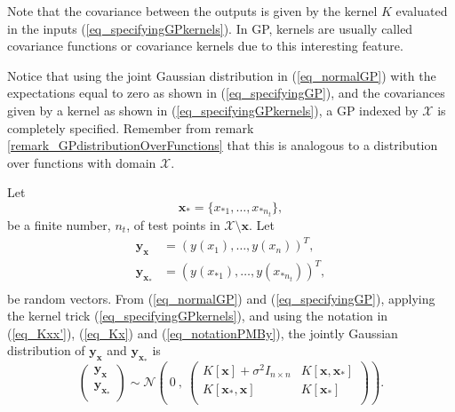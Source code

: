 \begin{remark}
  Note that the covariance between the outputs is given by the kernel $K$ evaluated in the inputs (\ref{eq_specifyingGPkernels}). In GP, kernels are usually called covariance functions or covariance kernels due to this interesting feature.
\end{remark}

\begin{remark} \label{remark_GPspecified}
  Notice that using the joint Gaussian distribution in (\ref{eq_normalGP}) with the expectations equal to zero as shown in (\ref{eq_specifyingGP}), and the covariances given by a kernel as shown in (\ref{eq_specifyingGPkernels}), a GP indexed by $\mathcal{X}$ is completely specified. Remember from remark \ref{remark_GPdistributionOverFunctions} that this is analogous to a distribution over functions with domain $\mathcal{X}$.
\end{remark}

Let
$$
  \pmb{x_*} = \{ x_{*1}, \dots, x_{*n_t} \},
$$
be a finite number, $n_t$, of test points in $\mathcal{X} \setminus \pmb{x}$. Let
\begin{equation} \label{eq_notationPMBy}
 \begin{aligned}
  \pmb{y_{x}}   &= \left( y(x_{1}), \dots, y(x_{n}) \right)^T, \\
  \pmb{y_{x_*}} &= \left( y(x_{*1}), \dots, y(x_{*n_t}) \right)^T, \\
 \end{aligned}
\end{equation}
be random vectors. From (\ref{eq_normalGP}) and (\ref{eq_specifyingGP}), applying the kernel trick (\ref{eq_specifyingGPkernels}), and using the notation in (\ref{eq_Kxx'}), (\ref{eq_Kx}) and (\ref{eq_notationPMBy}), the jointly Gaussian distribution of $\pmb{y_{x}}$ and $\pmb{y_{x_*}}$ is 
\begin{equation} \label{eq_jointyxyxstar}
  \begin{pmatrix}
    \pmb{y_x} \\ \pmb{y_{x_*}} \\
  \end{pmatrix} \sim
  \mathcal{N} \left(
  \ 0 \ , \
  \begin{pmatrix}
    K[\pmb{x}] + \sigma^2 I_{n \times n} & K[\pmb{x},\pmb{x_*}] \\
    K[\pmb{x_*},\pmb{x}]                 & K[\pmb{x_*}] \\
  \end{pmatrix}
  \right).
\end{equation}

